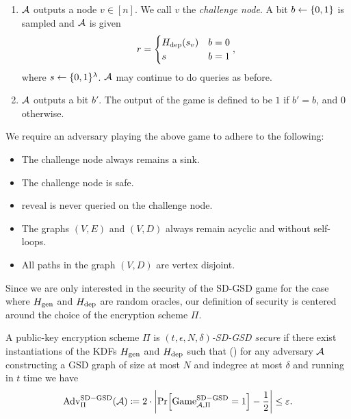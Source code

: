 \begin{definition}
\begin{enumerate}[1.]
\begin{itemize}
		      \end{itemize}
		\item $\mathcal{A}$ outputs a node $v \in [n]$. We call $v$ the \emph{challenge node}. A bit $b \leftarrow \{0, 1\}$ is sampled and $\mathcal{A}$ is given
		      \[
			      r = \begin{cases}
				      H_\mathrm{dep}(s_v) & b = 0 \\
				      s          & b = 1
			      \end{cases},
		      \]
		      where $s \leftarrow \{0, 1\}^\lambda$. $\mathcal{A}$ may continue to do queries as before.
		\item \label{def:sd-gsd-game-step-4} $\mathcal{A}$ outputs a bit $b'$. The output of the game is defined to be $1$ if $b' = b$, and $0$ otherwise.
	\end{enumerate}

	We require an adversary playing the above game to adhere to the following:
	\begin{itemize}
		\item The challenge node always remains a sink.
		\item The challenge node is safe.
		\item $\mathrm{reveal}$ is never queried on the challenge node.
		\item The graphs $(V, E)$ and $(V, D)$ always remain acyclic and without self-loops.
		\item All paths in the graph $(V, D)$ are vertex disjoint. 
	\end{itemize}
\end{definition}

Since we are only interested in the security of the SD-GSD game for the case where $H_\mathrm{gen}$ and $H_\mathrm{dep}$ are random oracles, our definition of security is centered around the choice of the encryption scheme $\Pi$.

\begin{definition}
	A public-key encryption scheme $\Pi$ is \emph{$(t, \epsilon, N, \delta)$-SD-GSD secure} if there exist instantiations of the KDFs $H_\mathrm{gen}$ and $H_\mathrm{dep}$ such that () for any adversary $\mathcal{A}$ constructing a GSD graph of size at most $N$ and indegree at most $\delta$ and running in $t$ time we have
	\begin{align*}
		\mathrm{Adv}_{\Pi}^{\mathrm{SD-GSD}}(\adv) \coloneqq 2 \cdot \abs*{\pr{\mathrm{Game}_{\adv, \Pi}^{\mathrm{SD-GSD}} = 1} - \frac{1}{2}} \le \epsilon.
	\end{align*}
\end{definition}

